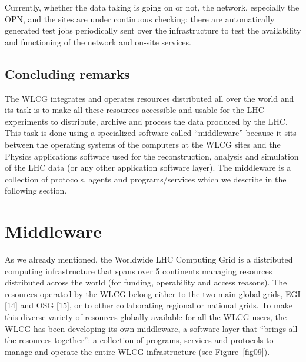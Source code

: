 \documentclass{intech}
\begin{document}
Currently, whether the data taking is going on or not, the network,
especially the OPN, and the sites are under continuous checking:
there  are automatically generated test jobs periodically sent over
the infrastructure to test the availability and functioning of the
network and on-site services.

\subsection{Concluding remarks}
%
The WLCG integrates and operates resources distributed all over the
world and its task is to make all these resources accessible and
usable for the LHC experiments to distribute, archive and process
the data produced by the LHC. This task is done using a specialized
software called ``middleware'' because it sits between the operating
systems of the computers at the WLCG sites and the Physics
applications software used for the reconstruction, analysis and
simulation of the LHC data (or any other application software
layer). The middleware is a collection of protocols, agents and
programs/services which we describe in the following section.


\section{Middleware}

As we already mentioned, the Worldwide LHC Computing Grid is a
distributed computing infrastructure that spans over 5 continents
managing resources distributed across the world (for funding,
operability and access reasons). The resources operated by the WLCG
belong either to the two main global grids, EGI [14] and OSG [15], or
to other collaborating regional or national grids. To make this
diverse variety of resources globally available for all the WLCG
users, the WLCG has been developing its own middleware, a software
layer that ``brings all the resources together'': a collection of
programs, services and protocols to manage and operate the entire
WLCG infrastructure (see Figure~\ref{fig09}).
\end{document}
